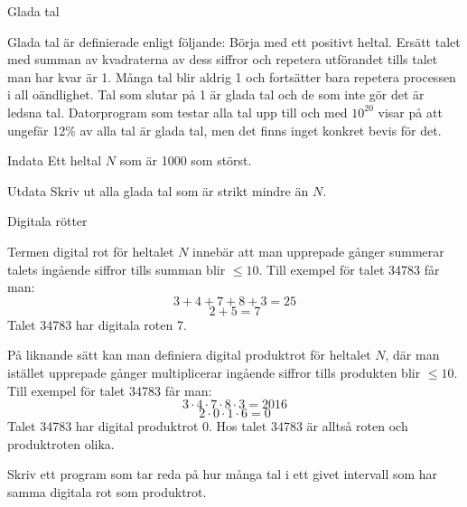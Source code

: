 \documentclass[10pt]{beamer}
\begin{document}
\begin{frame}{Glada tal}

Glada tal är definierade enligt följande: Börja med ett positivt heltal. Ersätt talet med summan av kvadraterna av dess siffror och repetera utförandet tills talet man har kvar är 1. Många tal blir aldrig 1 och fortsätter bara repetera processen i all oändlighet. Tal som slutar på 1 är glada tal och de som inte gör det är ledsna tal. Datorprogram som testar alla tal upp till och med $ 10^{20}$ visar på att ungefär 12\% av alla tal är glada tal, men det finns inget konkret bevis för det. 



\begin{exampleblock}{Indata}
Ett heltal $N$ som är 1000 som störst.
\end{exampleblock}

\begin{exampleblock}{Utdata}
Skriv ut alla glada tal som är strikt mindre än $N$.
\end{exampleblock}


\end{frame}



\begin{frame}{Digitala rötter}

Termen digital rot för heltalet $N$ innebär att man upprepade gånger summerar talets ingående siffror tills summan blir $\le10$. Till exempel för talet 34783 får man:
\vspace{-3mm}
$$3 + 4 + 7 + 8 + 3 = 25$$
$$2 + 5 = 7$$
Talet 34783 har digitala roten 7.

På liknande sätt kan man definiera digital produktrot för heltalet $N$, där man istället upprepade gånger multiplicerar ingående siffror tills produkten blir $\le10$. Till exempel för talet 34783 får man:
$$3 \cdot 4 \cdot 7 \cdot 8 \cdot 3 = 2016$$
$$2 \cdot 0 \cdot 1 \cdot 6 = 0$$
Talet 34783 har digital produktrot 0. Hos talet 34783 är alltså roten och produktroten olika.

Skriv ett program som tar reda på hur många tal i ett givet intervall som har samma digitala rot som produktrot.
\end{frame}
\end{document}
